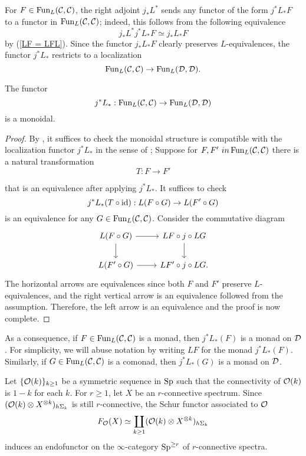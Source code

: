 For $F\in \operatorname{Fun}_{L}({\mathcal{C}},{\mathcal{C}})$, the right adjoint $j_*L^*$ sends any functor of the form $j^*L_*F$ to a functor in $\operatorname{Fun}_L({\mathcal{C}},{\mathcal{C}})$; indeed, this follows from the following equivalence
$$
j_*L^*j^*L_* F \simeq j_*L_*F
$$
by (\ref{LF = LFL}).
Since the functor $j_*L_*F$ clearly preserves $L$-equivalences, the functor $j^*L_*$ restricts to a localization
$$
\operatorname{Fun}_L({\mathcal{C}},{\mathcal{C}}) 
	\to 
	\operatorname{Fun}_L({\mathcal{D}},{\mathcal{D}}).
$$
\begin{lemma}
\label{j^*L_* is monoidal when restricted to Fun_L}
	The functor
	$$
	j^*L_*:\operatorname{Fun}_L({\mathcal{C}},{\mathcal{C}}) 
	\to 
	\operatorname{Fun}_L({\mathcal{D}},{\mathcal{D}})
	$$
	is a monoidal.
\end{lemma}
\begin{proof}
By \cite[Proposition 2.2.1.9.]{HA}, it suffices to check the monoidal structure is compatible with the localization functor $j^*L_*$ in the sense of \cite[Definition 2.2.1.6.]{HA};
	Suppose for $F, F' \ in \operatorname{Fun}_{L}({\mathcal{C}}, {\mathcal{C}})$ there is a natural transformation 
$$
T: F \to F'
$$

that is an equivalence after applying $j^*L_*$. 
It suffices to check
$$
j^*L_*(T\circ \operatorname{id}):
L(F\circ G) \to 
L(F'\circ G)
$$ 
is an equivalence for any $G\in \operatorname{Fun}_L({\mathcal{C}},{\mathcal{C}}) $.
Consider the commutative diagram
\[
\begin{tikzcd}
L(F\circ G) & LF \circ j\circ LG\\
L(F'\circ G) & LF' \circ j\circ LG.
    \arrow[from=1-1, to=1-2]
	\arrow[from=1-1, to=2-1]
	\arrow[from=2-1, to=2-2]
	\arrow[from=1-2, to=2-2]
\end{tikzcd}
\]
The horizontal arrows are equivalences since both $F$ and $F'$ preserve $L$-equivalences, and the right vertical arrow is an equivalence followed from the assumption.
Therefore, the left arrow is an equivalence and the proof is now complete.
\end{proof}
\begin{remark}
\label{j^*L_* is monoidal on Fun_L}
As a consequence, if $F\in \operatorname{Fun}_{L}({\mathcal{C}},{\mathcal{C}})$ is a monad, then 
$j^*L_*(F)$ is a monad on ${\mathcal{D}}$. For simplicity, we will abuse notation by writing $LF$ for the monad $j^*L_*(F)$.
Similarly, if $G\in \operatorname{Fun}_{L}({\mathcal{C}},{\mathcal{C}})$ is a comonad, then 
$j^*L_*(G)$ is a monad on ${\mathcal{D}}$.
\end{remark}

Let $\{{\mathcal{O}}(k)\}_{k \geq 1}$ be a symmetric sequence in $\operatorname{Sp}$ such that the connectivity of ${\mathcal{O}}(k)$ is $1-k$ for each $k$. 
For $r \geq 1$, let $X$ be an $r$-connective spectrum.
 Since $({\mathcal{O}}(k) \otimes X^{\otimes k})_{h\Sigma_k}$ is still $r$-connective, the Schur functor associated to ${\mathcal{O}}$ 
    $$
    F_{{\mathcal{O}}}(X) \simeq 
    \coprod_{k \geq 1} ({\mathcal{O}}(k) \otimes X^{\otimes k})_{h\Sigma_k}
    $$
induces an endofunctor on the $\infty$-category $\operatorname{Sp}^{\geq r}$ of $r$-connective spectra.

